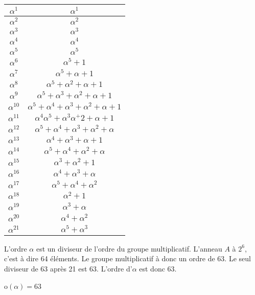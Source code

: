 \documentclass[a4paper,10pt]{article}
\begin{document}
\begin{enumerate}
\begin{center}
\begin{tabular}{|c|c|}
	\hline 	
	$\alpha^1$ & $\alpha^1$\\
	\hline 	
	$\alpha^2$ & $\alpha^2$\\
	\hline 	
	$\alpha^3$ & $\alpha^3$\\
	\hline 	
	$\alpha^4$ & $\alpha^4$\\
	\hline 	
	$\alpha^5$ & $\alpha^5$\\
	\hline 	
	$\alpha^6$ & $\alpha^5+1 $\\
	\hline 	
	$\alpha^7$ & $ \alpha^5+\alpha+1$\\
	\hline 	
	$\alpha^8$ &$\alpha^5+\alpha^2+\alpha+1 $ \\
	\hline 	
	$\alpha^9$ & $ \alpha^5+\alpha^3+\alpha^2+\alpha+1$\\
	\hline 	
	$\alpha^{10}$ & $ \alpha^5+\alpha^4+\alpha^3+\alpha^2+\alpha+1$\\
	\hline 	
	$\alpha^{11}$ & $\alpha^4\alpha^5+\alpha^3\alpha^+2+\alpha+1 $\\
	\hline 	
	$\alpha^{12}$ & $ \alpha^5+\alpha^4+\alpha^3+\alpha^2+\alpha$\\
	\hline 	
	$\alpha^{13}$ & $ \alpha^4+\alpha^3+\alpha+1$\\
	\hline 	
	$\alpha^{14}$ & $ \alpha^5+\alpha^4+\alpha^2+\alpha$\\
	\hline 	
	$\alpha^{15}$ & $\alpha^3+\alpha^2+1 $\\
	\hline 	
	$\alpha^{16}$ & $ \alpha^4+\alpha^3+\alpha$\\
	\hline 	
	$\alpha^{17}$ & $ \alpha^5+\alpha^4+\alpha^2$\\
	\hline 	
	$\alpha^{18}$ & $\alpha^2+1 $\\
	\hline 	
	$\alpha^{19}$ & $ \alpha^3+\alpha$\\
	\hline 	
	$\alpha^{20}$ & $ \alpha^4+\alpha^2$\\
	\hline 	
	$\alpha^{21}$ & $\alpha^5+\alpha^3 $\\
	\hline
\end{tabular}
\end{center}

L'ordre $\alpha$ est un diviseur de l'ordre du groupe multiplicatif. L'anneau $A$ à $2^6$, c'est à dire 64 éléments. Le groupe multiplicatif à donc un ordre de 63. Le seul diviseur de 63 après 21 est 63. L'ordre d'$\alpha$ est donc 63.

\begin{center}
o$(\alpha)=63$
\end{center}


\end{enumerate}
\end{document}
